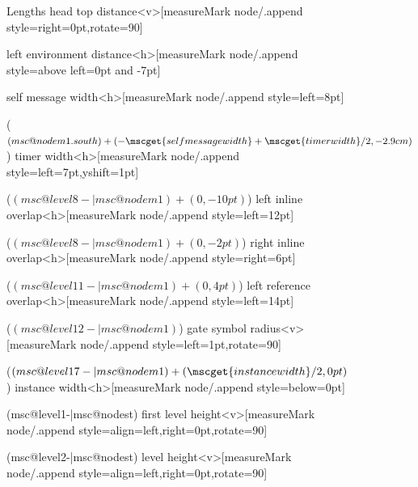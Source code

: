\documentclass[12pt,a4paper]{article}
\begin{document}
\begin{figure}[htb]
\begin{msc}[right environment distance=2.3cm]{Lengths}
    {head top distance}<v>[measureMark node/.append style={right=0pt,rotate=90}]
  
    {left environment distance}<h>[measureMark node/.append style={above left=0pt and -7pt}]
  
    {self message width}<h>[measureMark node/.append style={left=8pt}]
  
    {($(msc@nodem1.south)+(-\mscget{self message width}+\mscget{timer width}/2,-2.9cm)$)}%
    {timer width}<h>[measureMark node/.append style={left=7pt,yshift=1pt}]
  
    {($(msc@level8-|msc@nodem1)+(0,-10pt)$)}%
    {left inline overlap}<h>[measureMark node/.append style={left=12pt}]
  
    {($(msc@level8-|msc@nodem1)+(0,-2pt)$)}%
    {right inline overlap}<h>[measureMark node/.append style={right=6pt}]
  
    {($(msc@level11-|msc@nodem1)+(0,4pt)$)}%
    {left reference overlap}<h>[measureMark node/.append style={left=14pt}]
  
    {($(msc@level12-|msc@nodem1)$)}%
    {gate symbol radius}<v>[measureMark node/.append style={left=1pt,rotate=90}]
    
    {($(msc@level17-|msc@nodem1)+(\mscget{instance width}/2,0pt)$)}%
    {instance width}<h>[measureMark node/.append style={below=0pt}]
  
    {(msc@level1-|msc@nodest)}%
    {first level height}<v>[measureMark node/.append style={align=left,right=0pt,rotate=90}]
  
    {(msc@level2-|msc@nodest)}%
    {level height}<v>[measureMark node/.append style={align=left,right=0pt,rotate=90}]
  

\end{msc}
\end{figure}
\end{document}
